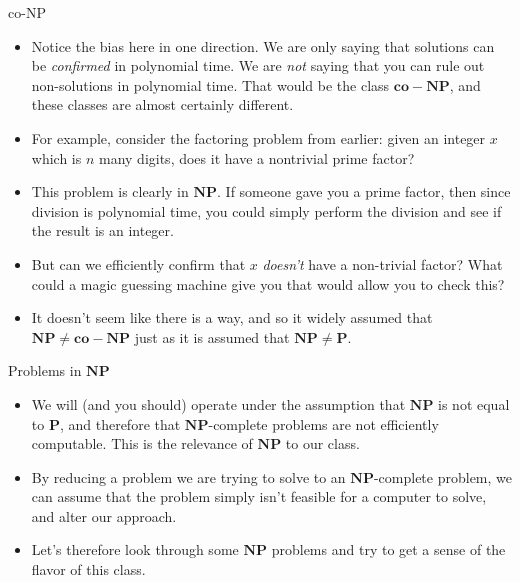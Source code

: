 \documentclass{beamer}
\begin{document}
\begin{frame}{co-NP}
    \begin{itemize}
        \item Notice the bias here in one direction. We are only saying that solutions can be \emph{confirmed} in polynomial time. We are \emph{not} saying that you can rule out non-solutions in polynomial time. That would be the class $\mathbf{co-NP}$, and these classes are almost certainly different. 
        \item For example, consider the factoring problem from earlier: given an integer $x$ which is $n$ many digits, does it have a nontrivial prime factor?
        \item This problem is clearly in $\mathbf{NP}$. If someone gave you a prime factor, then since division is polynomial time, you could simply perform the division and see if the result is an integer. \pause 
        \item But can we efficiently confirm that $x$ \emph{doesn't} have a non-trivial factor? What could a magic guessing machine give you that would allow you to check this? \pause 
        \item It doesn't seem like there is a way, and so it widely assumed that $\mathbf{NP} \neq \mathbf{co-NP}$ just as it is assumed that $\mathbf{NP} \neq \mathbf{P}$. 
    \end{itemize}
\end{frame}

\begin{frame}{Problems in $\mathbf{NP}$}
    \begin{itemize}
        \item We will (and you should) operate under the assumption that $\mathbf{NP}$ is not equal to $\mathbf{P}$, and therefore that $\mathbf{NP}$-complete problems are not efficiently computable. This is the relevance of $\mathbf{NP}$ to our class. \pause 
        \item By reducing a problem we are trying to solve to an $\mathbf{NP}$-complete problem, we can assume that the problem simply isn't feasible for a computer to solve, and alter our approach. \pause  
        \item Let's therefore look through some $\mathbf{NP}$ problems and try to get a sense of the flavor of this class.
    \end{itemize}
\end{frame}
\end{document}
